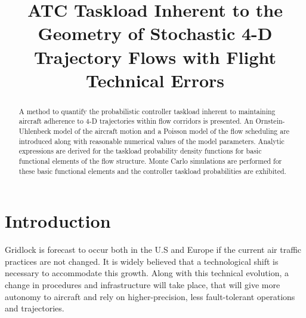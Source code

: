 \documentclass[conference]{IEEEtran}
\begin{document}







\title{ATC Taskload Inherent to the Geometry of Stochastic 4-D Trajectory Flows with Flight Technical Errors}


\author{
}













\maketitle


\begin{abstract}
A method to quantify the probabilistic controller taskload inherent to maintaining aircraft adherence to 4-D trajectories within flow corridors is presented. An Ornstein-Uhlenbeck model of the aircraft motion and a Poisson model of the flow scheduling are introduced along with reasonable numerical values of the model parameters. Analytic expressions are derived for the taskload probability density functions for basic functional elements of the flow structure. Monte Carlo simulations are performed for these basic functional elements and the controller taskload probabilities are exhibited.
\end{abstract}






\IEEEpeerreviewmaketitle

\section{Introduction}

Gridlock is forecast to occur both in the U.S and Europe if the current air traffic practices are not changed. It is widely believed that a technological shift is necessary to accommodate this growth. Along with this technical evolution, a change in procedures and infrastructure will take place, that will give more autonomy to aircraft and rely on higher-precision, less fault-tolerant operations and trajectories.
\end{document}
